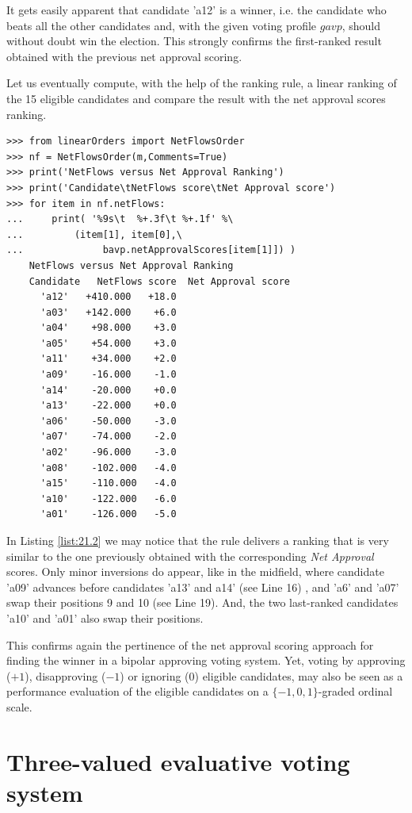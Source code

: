 It gets easily apparent that candidate 'a12' is a \Condorcet winner, i.e. the candidate who beats all the other candidates and, with the given voting profile $gavp$, should without doubt win the election. This strongly confirms the first-ranked result obtained with the previous net approval scoring. 

Let us eventually compute, with the help of the \NetFlows ranking rule, a linear ranking of the 15 eligible candidates and compare the result with the net approval scores ranking.
\begin{lstlisting}[caption={Comparing the net approval and the \NetFlows rankings},label=list:21.2]
>>> from linearOrders import NetFlowsOrder
>>> nf = NetFlowsOrder(m,Comments=True)
>>> print('NetFlows versus Net Approval Ranking')
>>> print('Candidate\tNetFlows score\tNet Approval score')
>>> for item in nf.netFlows:
...     print( '%9s\t  %+.3f\t %+.1f' %\
...	        (item[1], item[0],\
...              bavp.netApprovalScores[item[1]]) ) 
    NetFlows versus Net Approval Ranking
    Candidate	NetFlows score	Net Approval score
      'a12'	  +410.000	 +18.0
      'a03'	  +142.000	  +6.0
      'a04'	   +98.000	  +3.0
      'a05'	   +54.000	  +3.0
      'a11'	   +34.000	  +2.0
      'a09'	   -16.000	  -1.0
      'a14'	   -20.000	  +0.0
      'a13'	   -22.000	  +0.0
      'a06'	   -50.000	  -3.0
      'a07'	   -74.000	  -2.0
      'a02'	   -96.000	  -3.0
      'a08'	   -102.000	  -4.0
      'a15'	   -110.000	  -4.0
      'a10'	   -122.000	  -6.0
      'a01'	   -126.000	  -5.0
\end{lstlisting}
In Listing \ref{list:21.2} we may notice that the \NetFlows rule delivers a ranking that is very similar to the one previously obtained with the corresponding \emph{Net Approval} scores. Only minor inversions do appear, like in the midfield, where candidate 'a09' advances before candidates 'a13' and a14' (see Line 16) , and 'a6' and 'a07' swap their positions 9 and 10 (see Line 19). And, the two last-ranked candidates 'a10' and 'a01' also swap their positions.

This confirms again the pertinence of the net approval scoring approach for finding the winner in a bipolar approving voting system. Yet, voting by approving ($+1$), disapproving ($-1$) or ignoring ($0$) eligible candidates, may also be seen as a performance evaluation of the eligible candidates on a $\{-1, 0, 1\}$-graded ordinal scale.

\section{Three-valued evaluative voting system}
\label{sec:21.2}

